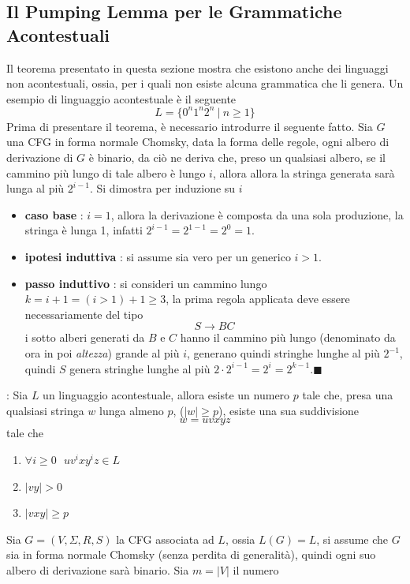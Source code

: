 \documentclass[10pt, letterpaper]{report}
\begin{document}
\subsection{Il Pumping Lemma per le Grammatiche Acontestuali} 
Il teorema presentato in questa sezione mostra che esistono anche dei linguaggi non acontestuali, ossia, per i quali non 
esiste alcuna grammatica che li genera. Un esempio di linguaggio acontestuale è il seguente 
$$ L=\{0^n1^n2^n\ | \ n\ge 1\}$$
Prima di presentare il teorema, è necessario introdurre il seguente fatto.\acc
\claim{} Sia $G$ una CFG in forma normale Chomsky, data la forma delle regole, ogni 
albero di derivazione di $G$ è binario, da ciò ne deriva che, preso un qualsiasi albero, se il cammino 
più lungo di tale albero è lungo $i$, allora  allora la stringa generata sarà 
lunga al più $2^{i-1}$.\acc 
{} Si dimostra per induzione su $i$\begin{itemize}
    \item \textbf{caso base} : $i=1$, allora la derivazione è composta da una sola produzione, la stringa 
    è lunga 1, infatti $2^{i-1}=2^{1-1}=2^0=1$. 
    \item \textbf{ipotesi induttiva} : si assume sia vero per un generico $i>1$. 
    \item \textbf{passo induttivo} : si consideri un cammino lungo $k=i+1 =  (i>1)+1 \ge 3$, la prima regola applicata 
    deve essere necessariamente del tipo $$S\longrightarrow BC$$ i sotto alberi generati da $B$ e $C$ hanno il 
    cammino più lungo (denominato da ora in poi \textit{altezza}) grande al più $i$, generano quindi stringhe 
    lunghe al più $2^{-1}$, quindi $S$ genera stringhe lunghe al più $2\cdot 2^{i-1}=2^i=2^{k-1}$.\hfill$\blacksquare$
\end{itemize}
 : Sia $L$ un linguaggio acontestuale, allora esiste un numero $p$ tale che, presa 
una qualsiasi stringa $w$ lunga almeno $p$, ($|w|\ge p$), esiste una sua suddivisione $$w=uvxyz$$ tale che\begin{enumerate}
    \item $\forall i\ge 0 \ \ \ uv^ixy^iz\in L$
    \item $|vy|>0$
    \item $|vxy|\ge p$
\end{enumerate}
 Sia $G=(V,\Sigma, R, S)$ la CFG associata ad $L$, ossia $L(G)=L$, si assume che $G$ sia in forma 
normale Chomsky (senza perdita di generalità), quindi ogni suo albero di derivazione sarà binario. Sia $m=|V|$ il numero 
\end{document}
